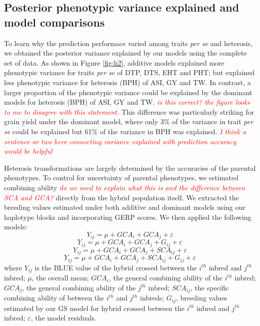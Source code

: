 \documentclass[twoside,twocolumn, letterpaper]{article}
\newcommand{\jri}[1]{\textcolor{red}{ \emph{ #1}} }
\begin{document}
\subsection*{Posterior phenotypic variance explained and model comparisons}

To learn why the prediction performace varied among traits \emph{per se} and heterosis, we obtained the posterior variance explained by our models using the complete set of data. 
As shown in Figure \ref{fig:h2}, additive models explained more phenotypic variance for traits \emph{per se} of DTP, DTS, EHT and PHT; but explained less phenotypic variance for heterosis (BPH) of ASI, GY and TW. 
In contrast, a larger proportion of the phenotypic variance could be explained by the dominant models for heterosis (BPH) of ASI, GY and TW. \jri{is this correct? the figure looks to me to disagree with this statement.}
This difference was particularly striking for grain yield under the dominant model, where only 3\% of the variance in trait \emph{per se} could be explained but 61\% of the variance in BPH was explained. \jri{I think a sentence or two here connecting variance explained with prediction accuracy would be helpful}

Heterosis transformations are largely determined by the accuracies of the parental phenotypes. 
To control for uncertainty of parental phenotypes, we estimated combining ability \jri{do we need to explain what this is and the difference between SCA and GCA?} directly from the hybrid population itself.
We extracted the breeding values estimated under both additive and dominant models using our haplotype blocks and incorporating GERP scores. 
We then applied the following models:
\begin{equation}
Y_{ij} = \mu + GCA_{i} + GCA_{j} + \varepsilon
\label{eq:refname1}
\end{equation}
\begin{equation}
Y_{ij} = \mu + GCA_{i} + GCA_{j} +  G_{ij} + \varepsilon
\label{eq:refname2}
\end{equation}
\begin{equation}
Y_{ij} = \mu + GCA_{i} + GCA_{j} + SCA_{ij} + \varepsilon
\label{eq:refname3}
\end{equation}
\begin{equation}
Y_{ij} = \mu + GCA_{i} + GCA_{j} + SCA_{ij} + G_{ij} + \varepsilon
\label{eq:refname4}
\end{equation}
where 
$Y_{ij}$ is the BLUE value of the hybrid crossed between the $i^{th}$ inbred and $j^{th}$ inbred; 
$\mu$, the overall mean; 
$GCA_{i}$, the general combining ability of the $i^{th}$ inbred;
$GCA_{j}$, the general combining ability of the $j^{th}$ inbred;
$SCA_{ij}$, the specific combining ability of between the $i^{th}$ and $j^{th}$ inbreds;
$G_{ij}$, breeding values estimated by our GS model for hybrid crossed between the $i^{th}$ inbred and $j^{th}$ inbred; 
$\varepsilon$, the model residuals.
\end{document}
